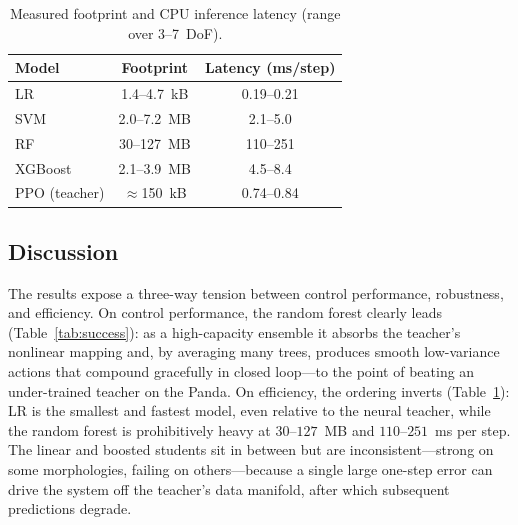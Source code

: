 \documentclass[conference]{IEEEtran}
\begin{document}
\begin{table}[t]
\centering
\caption{Measured footprint and CPU inference latency (range over 3--7~DoF).}
\label{tab:footprint}
\begin{tabular}{lcc}
\toprule
\textbf{Model} & \textbf{Footprint} & \textbf{Latency (ms/step)} \\
\midrule
LR              & 1.4--4.7~kB   & 0.19--0.21 \\
SVM             & 2.0--7.2~MB   & 2.1--5.0 \\
RF              & 30--127~MB    & 110--251 \\
XGBoost         & 2.1--3.9~MB   & 4.5--8.4 \\
\midrule
PPO (teacher)   & $\approx$150~kB & 0.74--0.84 \\
\bottomrule
\end{tabular}
\end{table}

\subsection{Discussion}
The results expose a three-way tension between control performance, robustness,
and efficiency. On control performance, the random forest clearly leads
(Table~\ref{tab:success}): as a high-capacity ensemble it absorbs the teacher's
nonlinear mapping and, by averaging many trees, produces smooth low-variance
actions that compound gracefully in closed loop---to the point of beating an
under-trained teacher on the Panda. On efficiency, the ordering inverts
(Table~\ref{tab:footprint}): LR is the smallest and fastest model, even relative
to the neural teacher, while the random forest is prohibitively heavy at
$30$--$127$~MB and $110$--$251$~ms per step. The linear and boosted students sit
in between but are inconsistent---strong on some morphologies, failing on
others---because a single large one-step error can drive the system off the
teacher's data manifold, after which subsequent predictions degrade.
\end{document}
